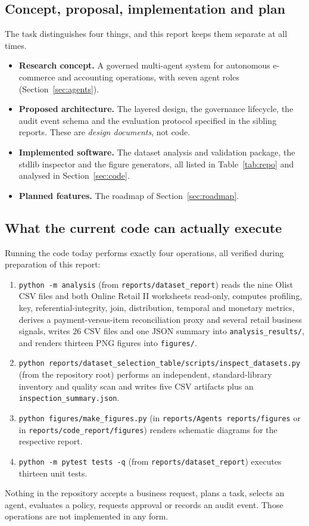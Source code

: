 \documentclass[11pt,a4paper]{article}
\newcommand{\code}[1]{\texttt{#1}}
\begin{document}
\subsection{Concept, proposal, implementation and plan}
The task distinguishes four things, and this report keeps them separate at all times.
\begin{itemize}
\item \textbf{Research concept.} A governed multi-agent system for autonomous e-commerce and accounting operations, with seven agent roles (Section~\ref{sec:agents}).
\item \textbf{Proposed architecture.} The layered design, the governance lifecycle, the audit event schema and the evaluation protocol specified in the sibling reports. These are \emph{design documents}, not code.
\item \textbf{Implemented software.} The dataset analysis and validation package, the stdlib inspector and the figure generators, all listed in Table~\ref{tab:repo} and analysed in Section~\ref{sec:code}.
\item \textbf{Planned features.} The roadmap of Section~\ref{sec:roadmap}.
\end{itemize}

\subsection{What the current code can actually execute}
Running the code today performs exactly four operations, all verified during preparation of this report:
\begin{enumerate}
\item \code{python -m analysis} (from \code{reports/dataset\_report}) reads the nine Olist CSV files and both Online Retail II worksheets read-only, computes profiling, key, referential-integrity, join, distribution, temporal and monetary metrics, derives a payment-versus-item reconciliation proxy and several retail business signals, writes 26 CSV files and one JSON summary into \code{analysis\_results/}, and renders thirteen PNG figures into \code{figures/}.
\item \code{python reports/dataset\_selection\_table/scripts/inspect\_datasets.py} (from the repository root) performs an independent, standard-library inventory and quality scan and writes five CSV artifacts plus an \code{inspection\_summary.json}.
\item \code{python figures/make\_figures.py} (in \code{reports/Agents reports/figures} or in \code{reports/code\_report/figures}) renders schematic diagrams for the respective report.
\item \code{python -m pytest tests -q} (from \code{reports/dataset\_report}) executes thirteen unit tests.
\end{enumerate}
Nothing in the repository accepts a business request, plans a task, selects an agent, evaluates a policy, requests approval or records an audit event. Those operations are not implemented in any form.
\end{document}
